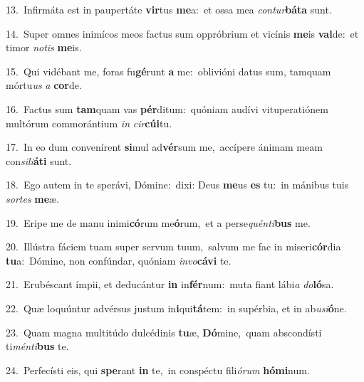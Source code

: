 {\numbfont\textcolor{\numbcolor}{13.}}~Infirmáta est in paupertáte \textbf{vir}\-tus \textbf{me}\-a:~\star et ossa mea \textit{con}\-\textit{tur}\textbf{bá}\textbf{ta} sunt.\par
{\numbfont\textcolor{\numbcolor}{14.}}~Super omnes inimícos meos factus sum oppróbrium et vicínis \textbf{me}\-is \textbf{val}\-de:~\star et timor \textit{no}\-\textit{tis} \textbf{me}\-is.\par
{\numbfont\textcolor{\numbcolor}{15.}}~Qui vidébant me, foras fu\-\textbf{gé}\-runt \textbf{a} me:~\star oblivióni datus sum, tamquam mórtu\textit{us} \textit{a} \textbf{cor}\-de.\par
{\numbfont\textcolor{\numbcolor}{16.}}~Factus sum \textbf{tam}\-quam vas \textbf{pér}\-ditum:~\star quóniam audívi vituperatiónem multórum commorántium \textit{in} \textit{cir}\-\textbf{cú}\textbf{i}tu.\par
{\numbfont\textcolor{\numbcolor}{17.}}~In eo dum convenírent \textbf{si}\-mul ad\-\textbf{vér}\-sum me,~\star accípere ánimam meam con\-\textit{si}\-\textit{li}\textbf{á}\textbf{ti} sunt.\par
{\numbfont\textcolor{\numbcolor}{18.}}~Ego autem in te sperávi, Dómine:~\dagger dixi: Deus \textbf{me}\-us \textbf{es} tu:~\star in mánibus tuis \textit{sor}\-\textit{tes} \textbf{me}\-æ.\par
{\numbfont\textcolor{\numbcolor}{19.}}~Eripe me de manu inimi\-\textbf{có}\-rum me\-\textbf{ó}\-rum,~\star et a perse\-\textit{quén}\-\textit{ti}\textbf{bus} me.\par
{\numbfont\textcolor{\numbcolor}{20.}}~Illústra fáciem tuam super servum tuum,~\dagger salvum me fac in miseri\-\textbf{cór}\-dia \textbf{tu}\-a:~\star Dómine, non confúndar, quóniam \textit{in}\-\textit{vo}\textbf{cá}\textbf{vi} te.\par
{\numbfont\textcolor{\numbcolor}{21.}}~Erubéscant ímpii, et deducántur \textbf{in} in\-\textbf{fér}\-num:~\star muta fiant lábi\textit{a} \textit{do}\-\textbf{ló}sa.\par
{\numbfont\textcolor{\numbcolor}{22.}}~Quæ loquúntur advérsus justum in\-\textbf{i}\-qui\-\textbf{tá}\-tem:~\star in supérbia, et in ab\-\textit{u}\-\textit{si}\textbf{ó}ne.\par
{\numbfont\textcolor{\numbcolor}{23.}}~Quam magna multitúdo dulcédinis \textbf{tu}\-æ, \textbf{Dó}\-mine,~\star quam abscondísti ti\-\textit{mén}\-\textit{ti}\textbf{bus} te.\par
{\numbfont\textcolor{\numbcolor}{24.}}~Perfecísti eis, qui \textbf{spe}\-rant \textbf{in} te,~\star in conspéctu fili\-\textit{ó}\-\textit{rum} \textbf{hó}\-\textbf{mi}num.\par
